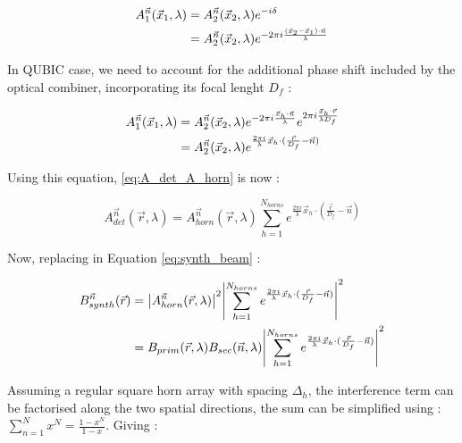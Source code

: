 \documentclass[../../thesis.tex]{subfiles}
\begin{document}
\begin{align}
    A_1^{\vec{n}}(\vec{x}_1, \lambda)
    &= A_2^{\vec{n}}(\vec{x}_2, \lambda) e^{-i\delta} \notag \\
    &= A_2^{\vec{n}}(\vec{x}_2, \lambda) e^{-2\pi i \frac{(\vec{x}_2 - \vec{x}_1) \cdot \vec{n}}{\lambda}}
\end{align}


In QUBIC case, we need to account for the additional phase shift included by the optical combiner, incorporating its focal lenght $D_f$ : 

\begin{align}
    A_1^{\vec{n}}(\vec{x}_1, \lambda)
    &= A_2^{\vec{n}}(\vec{x}_2, \lambda) e^{-2\pi i \frac{\vec{x}_h \cdot \vec{n}}{\lambda}} e^{2\pi i \frac{\vec{x}_h \cdot \vec{r}}{\lambda D_f}} \notag \\
    &= A_2^{\vec{n}}(\vec{x}_2, \lambda) e^{\frac{2\pi i}{\lambda} \vec{x}_h \cdot (\frac{\vec{r}}{D_f} - \vec{n})}
\end{align}

Using this equation, \ref{eq:A_det_A_horn} is now :

\begin{equation} 
    A_{det}^{\vec{n}}(\vec{r}, \lambda) = A_{horn}^{\vec{n}}(\vec{r}, \lambda) \sum_{h = 1}^{N_{horns}} e^{\frac{2\pi i}{\lambda} \vec{x}_h \cdot (\frac{\vec{r}}{D_f} - \vec{n})}
\end{equation}

Now, replacing in Equation \ref{eq:synth_beam} :

\begin{align}
    B_{synth}^{\vec{n}}(\vec{r})
    &= \abs{A_{horn}^{\vec{n}}(\vec{r}, \lambda)}^2 \abs{\sum_{h = 1}^{N_{horns}} e^{\frac{2\pi i}{\lambda} \vec{x}_h \cdot (\frac{\vec{r}}{D_f} - \vec{n})}}^2 \notag \\
    &= B_{prim}(\vec{r}, \lambda)B_{sec}(\vec{n}, \lambda)\abs{\sum_{h = 1}^{N_{horns}} e^{\frac{2\pi i}{\lambda} \vec{x}_h \cdot (\frac{\vec{r}}{D_f} - \vec{n})} }^2
\end{align}

Assuming a regular square horn array with spacing $\Delta_h$, the interference term can be factorised along the two spatial directions, the sum can be simplified using : $\sum_{n=1}^{N} x^N = \frac{1 - x^N}{1 - x}$. Giving : 
\end{document}
